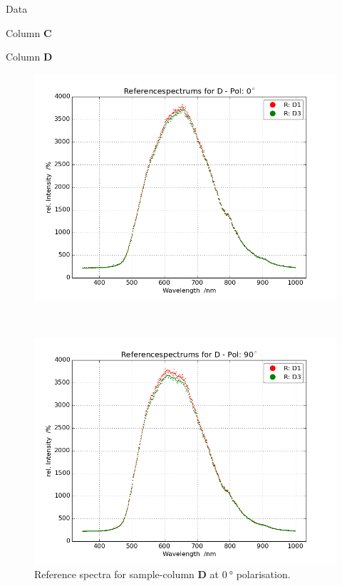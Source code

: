 \begin{appendix}
\begin{chapter}{Data}
\begin{section}{Column \textbf{C}}
    \end{section}
    
    
    
    \newpage
    \begin{section}{Column \textbf{D}}
      \label{Appendix:DataD}
      
      \begin{figure}[ht!]
        \centering
        \begin{minipage}{.92\textwidth}
          \centering
          \includegraphics[width=\textwidth]{Figures/Refspec_DPol0.png}
          \caption{Reference spectra for sample-column \textbf{D} at
              $\SI{0}{\degree}$ polarisation.}
          \label{fig:Refspec_DPol0}
        \end{minipage}\\
        \begin{minipage}{.92\textwidth}
          \centering
          \includegraphics[width=\textwidth]{Figures/Refspec_DPol90.png}

\end{minipage}
\end{figure}
\end{section}
\end{chapter}
\end{appendix}
